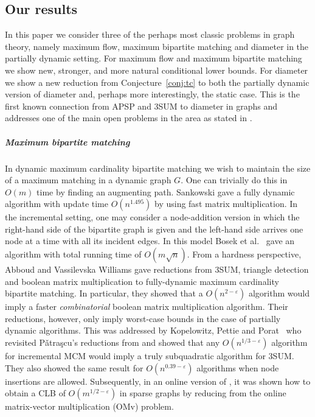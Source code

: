 \documentclass[a4paper,11pt]{article}
\newcommand{\eps}{\varepsilon}
\theoremstyle{definition}
\begin{document}
\subsection{Our results}
In this paper we consider three of the perhaps most classic problems in graph
theory, namely maximum flow, maximum bipartite matching and diameter in the
partially dynamic setting.
For maximum flow and maximum bipartite matching we
show new, stronger, and more natural conditional lower bounds. For diameter we
show a new reduction from Conjecture~\ref{conj:tc} to both the partially
dynamic version of diameter and, perhaps more interestingly, the static case.
This is the first known connection from APSP and 3SUM to diameter in graphs and
addresses one of the main open problems in the area as stated in
\cite{AbboudGV15}.

\subparagraph*{Maximum bipartite matching}
In dynamic maximum cardinality bipartite matching we wish to maintain the size
of a maximum matching in a dynamic graph $G$. One can trivially do this in
$O(m)$ time by finding an augmenting path. Sankowski \cite{Sankowski07} gave a fully
dynamic algorithm with update time $O(n^{1.495})$ by using fast matrix
multiplication. In the incremental setting, one may consider a node-addition version in which the right-hand side of the
bipartite graph is given and the left-hand side arrives one node at a time with
all its incident edges. In this model Bosek et al.~\cite{BosekLSZ14} gave an
algorithm with total running time of $O(m\sqrt{n})$. From a hardness
perspective, Abboud and Vassilevska Williams \cite{AbboudV14} gave reductions
from 3SUM, triangle detection and boolean matrix multiplication to
fully-dynamic maximum cardinality bipartite matching. In particular, they
showed that a $O(n^{2-\eps})$ algorithm would imply a faster \emph{combinatorial} boolean
matrix multiplication algorithm. Their reductions, however, only imply
worst-case bounds in the case of partially dynamic algorithms. This was
addressed by Kopelowitz, Pettie and Porat~\cite{KopelowitzPP16} who revisited
P\v{a}tra\c{s}cu's reductions from \cite{Patrascu10} and showed that any
$O(n^{1/3-\eps})$ algorithm for incremental MCM would imply a truly
subquadratic algorithm for 3SUM. They also showed the same result for
$O(n^{0.39-\eps})$ algorithms when node insertions are allowed. Subsequently,
in an online version of \cite{HenzingerKNS15}, it was shown how to obtain a CLB
of $O(m^{1/2-\eps})$ in sparse graphs by reducing from the online matrix-vector
multiplication (OMv) problem.
\end{document}
